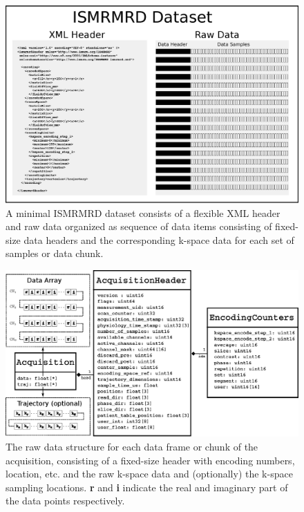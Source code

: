 \documentclass[12pt]{article}
\begin{document}
\begin{figure}
\begin{center}
\includegraphics[width=6in]{figure1_ismrmrd_format.eps}
\caption{A minimal ISMRMRD dataset consists of a flexible XML header and raw data organized as sequence of data items consisting of fixed-size data headers and the corresponding k-space data for each set of samples or data chunk.}
\label{fig:format}
\end{center}
\end{figure}

\begin{figure}
\begin{center}
\includegraphics[width=6in]{figure2_uml_diagram.eps}
\caption{The raw data structure for each data frame or chunk of the acquisition, consisting of a fixed-size header with encoding numbers, location, etc. and the raw k-space data and (optionally) the k-space sampling locations. \textbf{r} and \textbf{i} indicate the real and imaginary part of the data points respectively.}
\label{fig:cstruct}
\end{center}
\end{figure}
\end{document}
